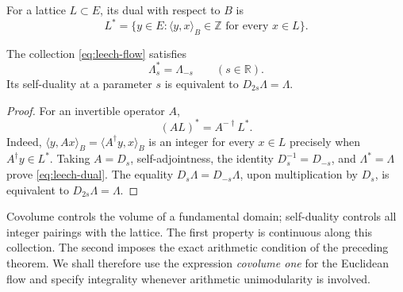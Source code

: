 \begin{definition}
For a lattice \(L\subset E\), its dual with respect to \(B\) is
\[
 L^*=\{y\in E:\langle y,x\rangle_B\in\mathbb Z
                         \text{ for every }x\in L\}.
\]
\end{definition}

\begin{theorem}
\label{thm:leech-dual}
The collection \eqref{eq:leech-flow} satisfies
\begin{equation}
 \Lambda_s^*=\Lambda_{-s}\qquad(s\in\mathbb R).
 \label{eq:leech-dual}
\end{equation}
Its self-duality at a parameter \(s\) is equivalent to
\(D_{2s}\Lambda=\Lambda\).
\end{theorem}
\begin{proof}
For an invertible operator \(A\),
\[
 (AL)^*=A^{-\dagger}L^*.
\]
Indeed, \(\langle y,Ax\rangle_B=\langle A^\dagger y,x\rangle_B\)
is an integer for every \(x\in L\) precisely when
\(A^\dagger y\in L^*\). Taking \(A=D_s\), self-adjointness,
the identity \(D_s^{-1}=D_{-s}\), and \(\Lambda^*=\Lambda\) prove
\eqref{eq:leech-dual}. The equality
\(D_s\Lambda=D_{-s}\Lambda\), upon multiplication by \(D_s\), is equivalent
to \(D_{2s}\Lambda=\Lambda\).
\end{proof}

Covolume controls the volume of a fundamental domain;
self-duality controls all integer pairings with the lattice.
The first property is continuous along this collection. The
second imposes the exact arithmetic condition of the preceding theorem.
We shall therefore use the expression \emph{covolume one} for the
Euclidean flow and specify integrality whenever arithmetic
unimodularity is involved.

